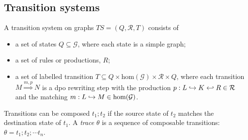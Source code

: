 
\subsection{Transition systems}
\label{sec:ts}

\begin{definition}[TS on graphs]
  A transition system on graphs $TS = (Q,\mathcal{R},T)$ consists of
  \begin{itemize}
  \item a set of states $Q\subseteq \mathcal{G}$, where each state is a simple graph;
  \item a set of rules or productions, $R$;
  \item a set of labelled transition $T\subseteq Q\times \text{hom}(\mathcal{G})\times \mathcal{R}\times Q$, where each transition $M \overset{m,p}{\Rightarrow} N$ is a dpo rewriting step with the production $p:L\hookrightarrow K\hookleftarrow R\in\mathcal{R}$ and the matching $m:L\hookrightarrow M\in\text{hom}(\mathcal{G})$.
  \end{itemize}
\end{definition}

Transitions can be composed $t_1;t_2$ if the source state of $t_2$ matches the destination state of $t_1$. A \emph{trace} $\theta$ is a sequence of composable transitions: $\theta=t_1;t_2;\cdots t_n$.

